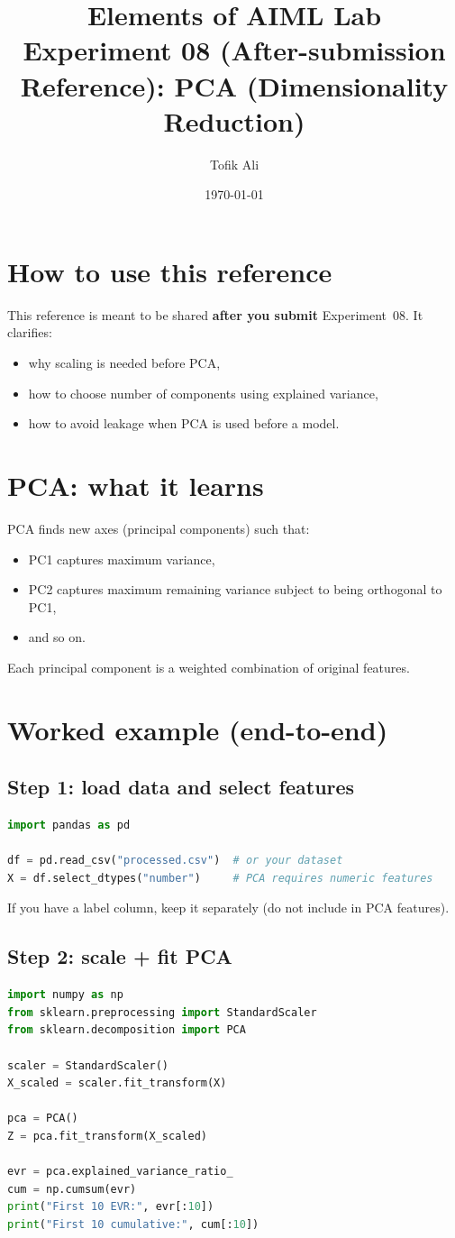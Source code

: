 \documentclass[11pt]{article}
\title{Elements of AIML Lab\\Experiment 08 (After-submission Reference): PCA (Dimensionality Reduction)}
\author{Tofik Ali}
\date{\today}
\begin{document}
\maketitle
\tableofcontents

\section{How to use this reference}
This reference is meant to be shared \textbf{after you submit} Experiment~08.
It clarifies:
\begin{itemize}[leftmargin=*]
  \item why scaling is needed before PCA,
  \item how to choose number of components using explained variance,
  \item how to avoid leakage when PCA is used before a model.
\end{itemize}

\section{PCA: what it learns}
PCA finds new axes (principal components) such that:
\begin{itemize}[leftmargin=*]
  \item PC1 captures maximum variance,
  \item PC2 captures maximum remaining variance subject to being orthogonal to PC1,
  \item and so on.
\end{itemize}
Each principal component is a weighted combination of original features.

\section{Worked example (end-to-end)}
\subsection{Step 1: load data and select features}
\begin{lstlisting}[language=Python]
import pandas as pd

df = pd.read_csv("processed.csv")  # or your dataset
X = df.select_dtypes("number")     # PCA requires numeric features
\end{lstlisting}
If you have a label column, keep it separately (do not include in PCA features).

\subsection{Step 2: scale + fit PCA}
\begin{lstlisting}[language=Python]
import numpy as np
from sklearn.preprocessing import StandardScaler
from sklearn.decomposition import PCA

scaler = StandardScaler()
X_scaled = scaler.fit_transform(X)

pca = PCA()
Z = pca.fit_transform(X_scaled)

evr = pca.explained_variance_ratio_
cum = np.cumsum(evr)
print("First 10 EVR:", evr[:10])
print("First 10 cumulative:", cum[:10])
\end{lstlisting}
\end{document}
